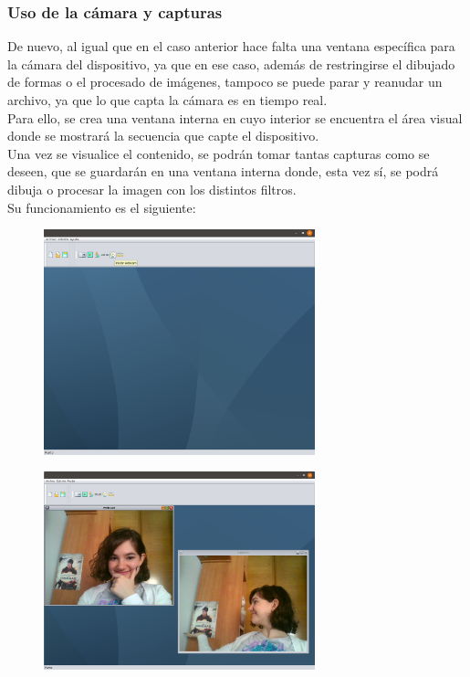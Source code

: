 \documentclass[11pt,a4paper]{article}
\begin{document}

\subsubsection{Uso de la cámara y capturas}
De nuevo, al igual que en el caso anterior hace falta una ventana específica para la cámara del dispositivo, ya que en ese caso, además de restringirse el dibujado de formas o el procesado de imágenes, tampoco se puede parar y reanudar un archivo, ya que lo que capta la cámara es en tiempo real.\\

Para ello, se crea una ventana interna en cuyo interior se encuentra el área visual donde se mostrará la secuencia que capte el dispositivo.\\

Una vez se visualice el contenido, se podrán tomar tantas capturas como se deseen, que se guardarán en una ventana interna donde, esta vez sí, se podrá dibuja o procesar la imagen con los distintos filtros.\\

Su funcionamiento es el siguiente:\\

\begin{figure}[H]
\centering
	\includegraphics[width=0.7\textwidth]{img/webcam.png}
\end{figure}

\begin{figure}[H]
\centering
	\includegraphics[width=0.7\textwidth]{img/captura.png}
\end{figure}
\end{document}
